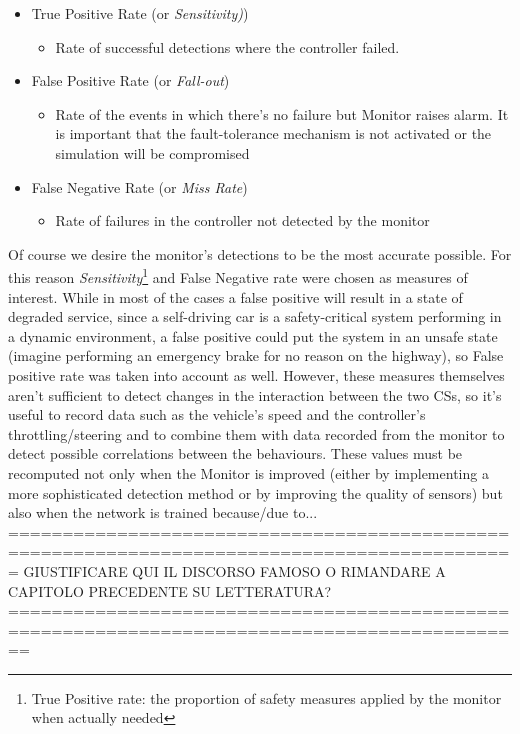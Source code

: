 \begin{itemize}
	\item True Positive Rate (or \textsl{Sensitivity)})
	\begin{itemize}
		\item Rate of successful detections where the controller failed.
	\end{itemize}
	\item False Positive Rate (or \textsl{Fall-out})
	\begin{itemize}
		\item Rate of the events in which there's no failure but Monitor raises alarm. It is important that the fault-tolerance mechanism is not activated or the simulation will be compromised
	\end{itemize}
	\item False Negative Rate (or \textsl{Miss Rate})
	\begin{itemize}
		\item Rate of failures in the controller not detected by the monitor
	\end{itemize}
\end{itemize}

Of course we desire the monitor's detections to be the most accurate possible. For this reason \textsl{Sensitivity}\footnote{True Positive rate: the proportion of safety measures applied by the monitor when actually needed} and False Negative rate were chosen as measures of interest.\newline
While in most of the cases a false positive will result in a state of degraded service, since a self-driving car is a safety-critical system performing in a dynamic environment, a false positive could put the system in an unsafe state (imagine performing an emergency brake for no reason on the highway), so False positive rate was taken into account as well.\newline
However, these measures themselves aren't sufficient to detect changes in the interaction between the two CSs, so it's useful to record data such as the vehicle's speed and the controller's throttling/steering and to combine them with data recorded from the monitor to detect possible correlations between the behaviours.
These values must be recomputed not only when the Monitor is improved (either by implementing a more sophisticated detection method or by improving the quality of sensors) but also when the network is trained because/due to...
=============================================================================================
GIUSTIFICARE QUI IL DISCORSO FAMOSO O RIMANDARE A CAPITOLO PRECEDENTE SU LETTERATURA?
==============================================================================================

